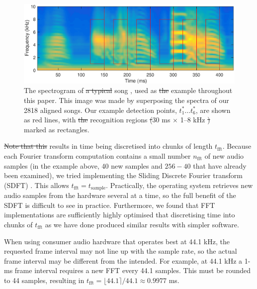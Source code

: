 \documentclass[10pt,letterpaper]{article}
\providecommand{\DIFaddtex}[1]{{\protect\color{blue}\uwave{#1}}} %
\providecommand{\DIFdeltex}[1]{{\protect\color{red}\sout{#1}}}                      %
\providecommand{\DIFaddbegin}{} %
\providecommand{\DIFaddend}{} %
\providecommand{\DIFdelbegin}{} %
\providecommand{\DIFdelend}{} %
\providecommand{\DIFaddFL}[1]{\DIFadd{#1}} %
\providecommand{\DIFdelFL}[1]{\DIFdel{#1}} %
\providecommand{\DIFaddbeginFL}{} %
\providecommand{\DIFaddendFL}{} %
\providecommand{\DIFdelbeginFL}{} %
\providecommand{\DIFdelendFL}{} %
\providecommand{\DIFadd}[1]{\texorpdfstring{\DIFaddtex{#1}}{#1}} %
\providecommand{\DIFdel}[1]{\texorpdfstring{\DIFdeltex{#1}}{}} %
\newcommand{\DIFscaledelfig}{0.5}
\newlength{\DIFdelgraphicswidth} %
\newlength{\DIFdelgraphicsheight} %
\newcommand{\DIFaddincludegraphics}[2][]{{\color{blue}\fbox{\DIFOincludegraphics[#1]{#2}}}} %
\newcommand{\DIFdelincludegraphics}[2][]{%
\sbox{\DIFdelgraphicsbox}{\DIFOincludegraphics[#1]{#2}}%
\settoboxwidth{\DIFdelgraphicswidth}{\DIFdelgraphicsbox} %
\settoboxtotalheight{\DIFdelgraphicsheight}{\DIFdelgraphicsbox} %
\scalebox{\DIFscaledelfig}{%
\parbox[b]{\DIFdelgraphicswidth}{\usebox{\DIFdelgraphicsbox}\\[-\baselineskip] \rule{\DIFdelgraphicswidth}{0em}}\llap{\resizebox{\DIFdelgraphicswidth}{\DIFdelgraphicsheight}{%
\setlength{\unitlength}{\DIFdelgraphicswidth}%
\begin{picture}(1,1)%
\thicklines\linethickness{2pt} %
{\color[rgb]{1,0,0}\put(0,0){\framebox(1,1){}}}%
{\color[rgb]{1,0,0}\put(0,0){\line( 1,1){1}}}%
{\color[rgb]{1,0,0}\put(0,1){\line(1,-1){1}}}%
\end{picture}%
}\hspace*{3pt}}} %
} %
\DeclareRobustCommand{\DIFaddbegin}{\DIFOaddbegin \let\includegraphics\DIFaddincludegraphics} %
\DeclareRobustCommand{\DIFaddend}{\DIFOaddend \let\includegraphics\DIFOincludegraphics} %
\DeclareRobustCommand{\DIFdelbegin}{\DIFOdelbegin \let\includegraphics\DIFdelincludegraphics} %
\DeclareRobustCommand{\DIFdelend}{\DIFOaddend \let\includegraphics\DIFOincludegraphics} %
\DeclareRobustCommand{\DIFaddbeginFL}{\DIFOaddbeginFL \let\includegraphics\DIFaddincludegraphics} %
\DeclareRobustCommand{\DIFaddendFL}{\DIFOaddendFL \let\includegraphics\DIFOincludegraphics} %
\DeclareRobustCommand{\DIFdelbeginFL}{\DIFOdelbeginFL \let\includegraphics\DIFdelincludegraphics} %
\DeclareRobustCommand{\DIFdelendFL}{\DIFOaddendFL \let\includegraphics\DIFOincludegraphics} %
\begin{document}
\begin{figure}
  \includegraphics[width=\textwidth]{Fig1}
  \caption{The spectrogram of \DIFdelbeginFL \DIFdelFL{a typical }\DIFdelendFL \DIFaddbeginFL \DIFaddFL{the }\DIFaddendFL song \DIFaddbeginFL \DIFaddFL{of lny64}\DIFaddendFL , used as \DIFdelbeginFL \DIFdelFL{the }\DIFdelendFL \DIFaddbeginFL \DIFaddFL{an }\DIFaddendFL example
    throughout this paper.  This image was made by superposing the
    spectra of our 2818 aligned songs.  Our example detection points,
    $t^*_1\ldots t^*_6$, are shown as red lines, with \DIFdelbeginFL \DIFdelFL{the }\DIFdelendFL \DIFaddbeginFL \DIFaddFL{example }\DIFaddendFL recognition
    regions \DIFdelbeginFL \DIFdelFL{(}\DIFdelendFL \DIFaddbeginFL \DIFaddFL{of }\DIFaddendFL 30 ms $\times$ 1--8 kHz \DIFdelbeginFL \DIFdelFL{) }\DIFdelendFL marked as rectangles.}
  \label{fig:song}
\end{figure}



\DIFdelbegin \DIFdel{Note that this }\DIFdelend \DIFaddbegin \DIFadd{This }\DIFaddend results in time being discretised into chunks of length
$t_\mathrm{fft}$.  Because each Fourier transform computation contains
a small number $n_\mathrm{fft}$ of new audio samples (in the example
above, 40 new samples and $256-40$ that have already been examined),
we tried implementing the Sliding Discrete Fourier transform (SDFT)
\cite{Jacobsen2003SlidingDFT}.  This allows
$t_\textrm{fft}=t_\textrm{sample}$.  Practically, the operating system
retrieves new audio samples from the hardware several at a time, so
the full benefit of the SDFT is difficult to see in practice.
Furthermore, we found that FFT implementations are sufficiently highly
optimised that discretising time into chunks of $t_\mathrm{fft}$ as we
have done produced similar results with simpler software.

When using consumer audio hardware that operates best at 44.1 kHz, the
requested frame interval may not line up with the sample rate, so the
actual frame interval may be different from the intended.  For
example, at 44.1 kHz a 1-ms frame interval requires a new FFT every
44.1 samples.  This must be rounded to 44 samples, resulting in
$t_\textrm{fft}=\lfloor 44.1 \rceil / 44.1 \approx 0.9977$ ms.
\end{document}
